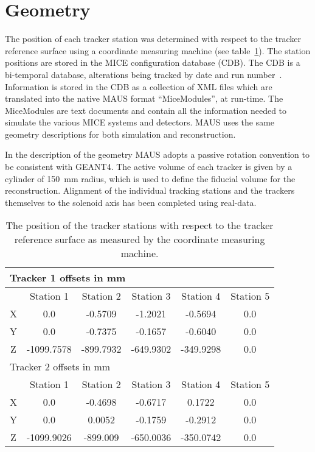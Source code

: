 \section{Geometry}
\label{sec:Geometry}
  
  The position of each tracker station was determined with respect to the tracker reference surface using a coordinate measuring machine (see table~\ref{tab:CMM}). The station positions are stored in the MICE configuration database (CDB). The CDB is a bi-temporal database, alterations being tracked by date and run number~\cite{DavidForrestThesis}. Information is stored in the CDB as a collection of XML files which are translated into the native MAUS format ``MiceModules'', at run-time.  The MiceModules are text documents and contain all the information needed to simulate the various MICE systems and detectors.  MAUS uses the same geometry descriptions for both simulation and reconstruction.
  
  In the description of the geometry MAUS adopts a passive rotation convention to be consistent with GEANT4.  The active volume of each tracker is given by a cylinder of 150~mm radius, which is used to define the fiducial volume for the reconstruction. Alignment of the individual tracking stations and the trackers themselves to the solenoid axis has been completed using real-data.
   
  \begin{table} [tbh]
    \begin{center}
      \begin{tabular} {|c|c|c|c|c|c|}
	\hline
	\multicolumn{6}{|l|}{Tracker 1 offsets in mm} \\
	\hline
	& Station 1 & Station 2 & Station 3 & Station 4 & Station 5 \\
	\hline
	X & 0.0 & -0.5709 & -1.2021 & -0.5694 & 0.0 \\
	Y & 0.0 & -0.7375 & -0.1657 & -0.6040 & 0.0 \\
	Z & -1099.7578 & -899.7932 & -649.9302 & -349.9298 & 0.0 \\
	\hline
	\hline
	\multicolumn{6}{|l|}{Tracker 2 offsets in mm} \\
	\hline
	& Station 1 & Station 2 & Station 3 & Station 4 & Station 5 \\
	\hline
	X & 0.0 & -0.4698 & -0.6717 & 0.1722 & 0.0 \\
	Y & 0.0 & 0.0052 & -0.1759 & -0.2912 & 0.0 \\
	Z & -1099.9026 & -899.009 & -650.0036 & -350.0742 & 0.0 \\
	\hline
      \end{tabular}
      \caption{\label{tab:CMM} The position of the tracker stations with respect to the tracker reference surface as measured by the coordinate measuring machine.}
    \end{center}
  \end{table}
  
